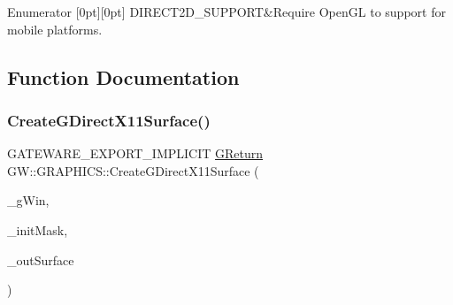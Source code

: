 \begin{DoxyEnumFields}{Enumerator}
[0pt][0pt]{}\mbox{\label{namespaceGW_1_1GRAPHICS_afbd9d6f65375744d2338ce060d42c85ba9c847baaca0bdcb897b2332cc8d3b5dc}} 
D\+I\+R\+E\+C\+T2\+D\+\_\+\+S\+U\+P\+P\+O\+RT&Require Open\+GL to support for mobile platforms. \\
\hline

\end{DoxyEnumFields}


\subsection{Function Documentation}
\mbox{\label{namespaceGW_1_1GRAPHICS_a3fc9ce5171f60466f1e8784ea13b31ce}} 
\subsubsection{\texorpdfstring{Create\+G\+Direct\+X11\+Surface()}{CreateGDirectX11Surface()}}
{\footnotesize\ttfamily G\+A\+T\+E\+W\+A\+R\+E\+\_\+\+E\+X\+P\+O\+R\+T\+\_\+\+I\+M\+P\+L\+I\+C\+IT \mbox{\hyperlink{namespaceGW_a67a839e3df7ea8a5c5686613a7a3de21}{G\+Return}} G\+W\+::\+G\+R\+A\+P\+H\+I\+C\+S\+::\+Create\+G\+Direct\+X11\+Surface (\begin{DoxyParamCaption}\item[{\mbox{\hyperlink{classGW_1_1SYSTEM_1_1GWindow}{S\+Y\+S\+T\+E\+M\+::\+G\+Window}} $\ast$}]{\+\_\+g\+Win,  }\item[{unsigned long long}]{\+\_\+init\+Mask,  }\item[{\mbox{\hyperlink{classGW_1_1GRAPHICS_1_1GDirectX11Surface}{G\+Direct\+X11\+Surface}} $\ast$$\ast$}]{\+\_\+out\+Surface }\end{DoxyParamCaption})}



